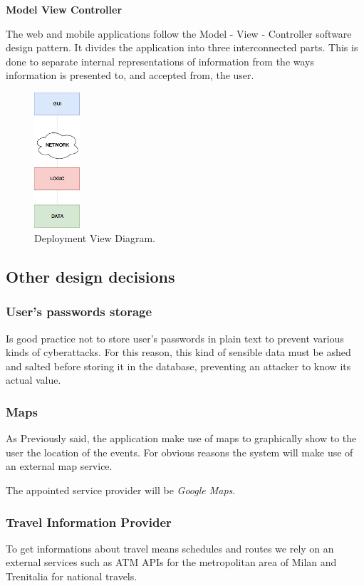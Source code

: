 \documentclass{article}
\begin{document}
	\bigskip
	\noindent
	\textbf{Model View Controller}

	\bigskip
	\noindent
	The web and mobile applications follow the Model - View - Controller software design pattern.
	It divides the application into three interconnected parts. This is done to separate internal representations of information from the ways information is presented to, and accepted from, the user.

	\bigskip
	\begin{figure}[!ht]
	\centering
	\includegraphics[width=0.15\textwidth]{img/diagrams/rp.png}
	\caption{Deployment View Diagram.}
	\end{figure}

	\subsection{Other design decisions}
	\subsubsection{User's passwords storage}
	Is good practice not to store user's passwords in plain text to prevent various kinds of cyberattacks. For this reason, this kind of sensible data must be ashed and salted before storing it in the database, preventing an attacker to know its actual value. 


	\subsubsection{Maps}
	As Previously said, the application make use of maps to graphically show to the user the location of the events. For obvious reasons the system will make use of an external map service.

	The appointed service provider will be \textit{Google Maps}.


	\subsubsection{Travel Information Provider}
	To get informations about travel means schedules and routes we rely on an external services such as ATM APIs for the metropolitan area of Milan and Trenitalia for national travels.
\end{document}
